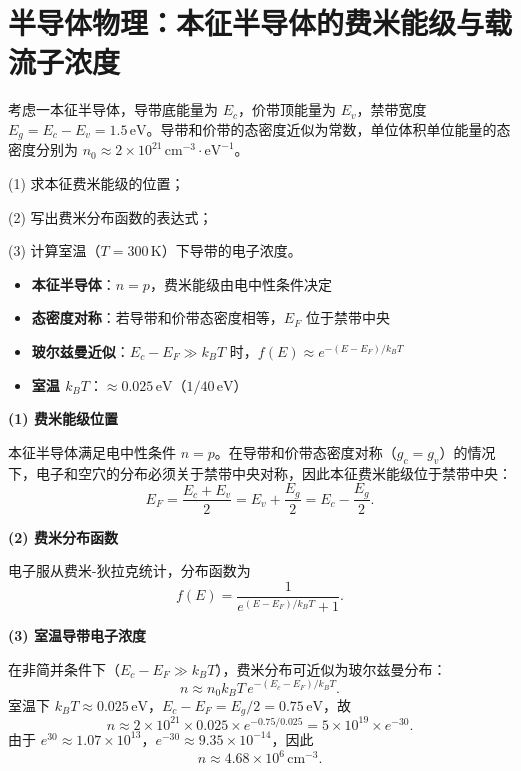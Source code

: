 \section{半导体物理：本征半导体的费米能级与载流子浓度}
\label{sec:intrinsic-semiconductor}

\begin{modelbox}[题目：本征半导体的统计性质]
考虑一本征半导体，导带底能量为 $E_c$，价带顶能量为 $E_v$，禁带宽度 $E_g=E_c-E_v=1.5\,\text{eV}$。导带和价带的态密度近似为常数，单位体积单位能量的态密度分别为 $n_0\approx2\times10^{21}\,\text{cm}^{-3}\cdot\text{eV}^{-1}$。

(1) 求本征费米能级的位置；

(2) 写出费米分布函数的表达式；

(3) 计算室温（$T=300\,\text{K}$）下导带的电子浓度。
\end{modelbox}

\begin{tipbox}[考点快速分析]
\begin{itemize}
    \item \textbf{本征半导体}：$n=p$，费米能级由电中性条件决定
    \item \textbf{态密度对称}：若导带和价带态密度相等，$E_F$ 位于禁带中央
    \item \textbf{玻尔兹曼近似}：$E_c-E_F\gg k_BT$ 时，$f(E)\approx e^{-(E-E_F)/k_BT}$
    \item \textbf{室温 $k_BT$}：$\approx0.025\,\text{eV}$（$1/40\,\text{eV}$）
\end{itemize}
\end{tipbox}

\begin{derivationbox}[标准解题过程]
\textbf{(1) 费米能级位置}

本征半导体满足电中性条件 $n=p$。在导带和价带态密度对称（$g_c=g_v$）的情况下，电子和空穴的分布必须关于禁带中央对称，因此本征费米能级位于禁带中央：
\begin{equation}
\boxed{E_F=\frac{E_c+E_v}{2}=E_v+\frac{E_g}{2}=E_c-\frac{E_g}{2}.}
\end{equation}

\textbf{(2) 费米分布函数}

电子服从费米-狄拉克统计，分布函数为
\begin{equation}
\boxed{f(E)=\frac{1}{e^{(E-E_F)/k_BT}+1}.}
\end{equation}

\textbf{(3) 室温导带电子浓度}

在非简并条件下（$E_c-E_F\gg k_BT$），费米分布可近似为玻尔兹曼分布：
\[
n\approx n_0k_BT\,e^{-(E_c-E_F)/k_BT}.
\]
室温下 $k_BT\approx0.025\,\text{eV}$，$E_c-E_F=E_g/2=0.75\,\text{eV}$，故
\[
n\approx2\times10^{21}\times0.025\times e^{-0.75/0.025}=5\times10^{19}\times e^{-30}.
\]
由于 $e^{30}\approx1.07\times10^{13}$，$e^{-30}\approx9.35\times10^{-14}$，因此
\begin{equation}
\boxed{n\approx4.68\times10^6\,\text{cm}^{-3}.}
\end{equation}
\end{derivationbox}

